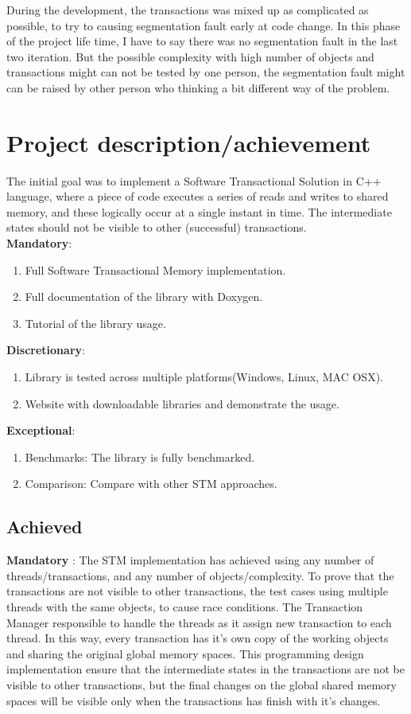 \documentclass[12pt]{article}
\begin{document}
During the development, the transactions was mixed up as complicated as possible, to try to causing segmentation fault early at code change. In this phase of the project life time, I have to say there was no segmentation fault in the last two iteration. But the possible complexity with high number of objects and transactions might can not be tested by one person, the segmentation fault might can be raised by other person who thinking a bit different way of the problem.\\   
   
\newpage
\section{Project description/achievement}
The initial goal was to implement a Software Transactional Solution in C++ language, where a piece of code executes a series of reads and writes to shared memory, and these logically occur at a single instant in time. The intermediate states should not be visible to other (successful) transactions.\\
\textbf{Mandatory}:
\begin{enumerate}
\item Full Software Transactional Memory implementation. 
\item Full documentation of the library with Doxygen.
\item Tutorial of the library usage.
\end{enumerate}
\textbf{Discretionary}:
\begin{enumerate}
\item Library is tested across multiple platforms(Windows, Linux, MAC OSX). 
\item Website with downloadable libraries and demonstrate the usage.
\end{enumerate}
\textbf{Exceptional}:
\begin{enumerate}
\item Benchmarks: The library is fully benchmarked. 
\item Comparison: Compare with other STM approaches.
\end{enumerate}
\subsection{Achieved}
\textbf{Mandatory} : The STM implementation has achieved using any number of threads/transactions, and any number of objects/complexity. To prove that the transactions are not visible to other transactions, the test cases using multiple threads with the same objects, to cause race conditions. The Transaction Manager responsible to handle the threads as it assign new transaction to each thread. In this way, every transaction has it's own copy of the working objects and sharing the original global memory spaces. This programming design implementation ensure that the intermediate states in the transactions are not be visible to other transactions, but the final changes on the global shared memory spaces will be visible only when the transactions has finish with it's changes.\\
 
\end{document}
